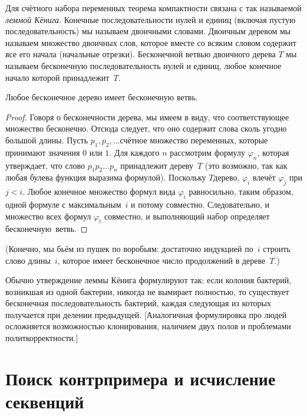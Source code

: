 Для счётного набора переменных теорема компактности связана с
так называемой \emph{леммой Кёнига}.%
Конечные последовательности
нулей и единиц (включая пустую последовательность) мы называем
двоичными словами. Двоичным деревом%
мы называем множество
двоичных слов, которое вместе со всяким словом содержит все
его начала (начальные отрезки).
Бесконечной ветвью двоичного дерева $T$ мы называем
бесконечную последовательность нулей и единиц, любое конечное
начало которой принадлежит~$T$.

\begin{theorem}
%
%
Любое бесконечное дерево имеет бесконечную ветвь.
\end{theorem}

\begin{proof}
Говоря о бесконечности дерева, мы имеем в виду, что
соответствующее множество бесконечно. Отсюда следует, что оно
содержит слова сколь угодно большой длины. Пусть
$p_1,p_2,\dots$\т счётное множество переменных, которые
принимают значения $0$ или $1$. Для каждого $n$ рассмотрим
формулу $\varphi_n$, которая утверждает, что слово $p_1p_2\dots
p_n$ принадлежит дереву~$T$ (это возможно, так как любая булева
функция выразима формулой). Поскольку $T$\т дерево, $\varphi_i$
влечёт $\varphi_j$ при $j<i$. Любое конечное множество формул
вида $\varphi_i$ равносильно, таким образом, одной формуле с
максимальным~$i$ и потому совместно. Следовательно, и множество
всех формул $\varphi_i$ совместно, и выполняющий набор
определяет бесконечную~ветвь.
\end{proof}

(Конечно, мы  бьём из пушек
по воробьям: достаточно индукцией по~$i$ строить слово
длины~$i$, которое имеет бесконечное число продолжений в
дереве~$T$.)

Обычно утверждение леммы Кёнига формулируют так: если колония
бактерий, возникшая из одной бактерии, никогда не вымирает
полностью, то существует бесконечная последовательность
бактерий, каждая следующая из которых получается при делении
предыдущей. [Аналогичная формулировка про людей осложняется
возможностью клонирования, наличием двух полов и проблемами
политкорректности.]

\section[Поиск контрпримера и исчисление секвенций]
        {Поиск контрпримера и исчисление секвенций}

